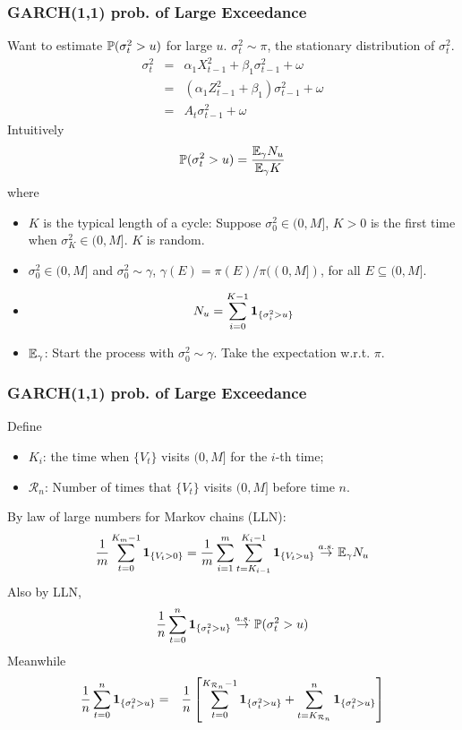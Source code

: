 \documentclass{beamer}
\begin{document}
\begin{frame}
  \frametitle{GARCH(1,1) prob. of Large Exceedance}
  Want to estimate $\P(\sigma_t^2 > u)$ for large $u$. $\sigma_t^2
  \sim \pi$, the stationary distribution of $\sigma_t^2$.
  \begin{eqnarray*}
    \sigma_t^2 &=& \alpha_1 X_{t-1}^2 + \beta_1 \sigma_{t-1}^2 + \omega \\
               &=& (\alpha_1 Z_{t-1}^2 + \beta_1) \sigma_{t-1}^2 + \omega
    \\
               &=& A_t \sigma_{t-1}^2 + \omega
  \end{eqnarray*}
   Intuitively
   \[
   \P(\sigma^2_t > u) = {
     \E_\gamma N_u
     \over
     \E_\gamma K
   }
   \]
   where
   \begin{footnotesize}
     \begin{itemize}
     \item $K$ is the typical length of a cycle: Suppose $\sigma_0^2 \in
       (0, M]$, $K > 0$ is the first time when $\sigma_K^2 \in
       (0, M]$. $K$ is random.
     \item $\sigma_0^2 \in (0, M]$ and $\sigma_0^2 \sim \gamma$,
       $\gamma(E) = \pi(E) / \pi((0, M])$, for all $E \subseteq (0,
       M]$.
     \item
       \[
       N_u = \sum_{i=0}^{K - 1} \1{\sigma^2_i > u}
       \]
     \item $\E_\gamma$: Start the process with $\sigma_0^2 \sim
       \gamma$. Take the expectation w.r.t. $\pi$.
     \end{itemize}
   \end{footnotesize}
 \end{frame}

 \begin{frame}
   \frametitle{GARCH(1,1) prob. of Large Exceedance}
   Define
   \begin{itemize}
   \item $K_i$: the time when $\{V_t\}$ visits $(0, M]$ for the
     $i$-th time;
   \item $\mathcal R_n$: Number of times that $\{V_t\}$ visits $(0, M]$
     before time $n$.
   \end{itemize}
   By law of large numbers for Markov chains (LLN):
   \[
     {1 \over m} \sum_{t=0}^{K_m - 1} \1{V_t > 0}
     =
     {1 \over m} \sum_{i=1}^m
     \sum_{t=K_{i-1}}^{K_i - 1} \1{V_t > u}
     \overset{a.s.}{\to}
     \E_\gamma N_u     
   \]
   Also by LLN,
   \[
     {1 \over n} \sum_{t=0}^n \1{\sigma_t^2 > u}
     \overset{a.s.}{\to}
     \P(\sigma_t^2 > u)
     \]
     Meanwhile
   \begin{eqnarray*}
     {1 \over n} \sum_{t=0}^n \1{\sigma_t^2 > u}
     &=&
     {1 \over n}
     \left[
       \sum_{t=0}^{K_{\mathcal R_n} - 1} \1{\sigma_t^2 > u}
       +
       \sum_{t=K_{\mathcal R_n}}^{n} \1{\sigma_t^2 > u}
     \right]
   \end{eqnarray*}
 \end{frame}
\end{document}
